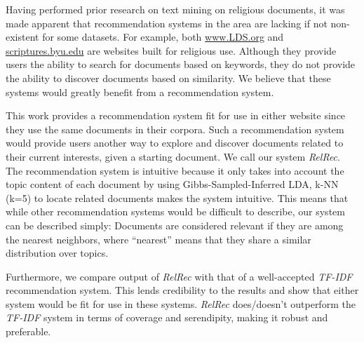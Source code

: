 
Having performed prior research on text mining on religious documents, it was made apparent that recommendation systems in the area are lacking if not non-existent for some datasets. For example, both \url{www.LDS.org} and \url{scriptures.byu.edu} are websites built for religious use. Although they provide users the ability to search for documents based on keywords, they do not provide the ability to discover documents based on similarity. We believe that these systems would greatly benefit from a recommendation system.

This work provides a recommendation system fit for use in either website since they use the same documents in their corpora. Such a recommendation system would provide users another way to explore and discover documents related to their current interests, given a starting document. We call our system \emph{RelRec}. The recommendation system is intuitive because it only takes into account the topic content of each document by using Gibbs-Sampled-Inferred LDA, k-NN (k=5) to locate related documents makes the system intuitive. This means that while other recommendation systems would be difficult to describe, our system can be described simply: Documents are considered relevant if they are among the nearest neighbors, where ``nearest'' means that they share a similar distribution over topics.

Furthermore, we compare output of \emph{RelRec} with that of a well-accepted \emph{TF-IDF} recommendation system. This lends credibility to the results and show that either system would be fit for use in these systems. \emph{RelRec} does/doesn’t outperform the \emph{TF-IDF} system in terms of coverage and serendipity, making it robust and preferable.
